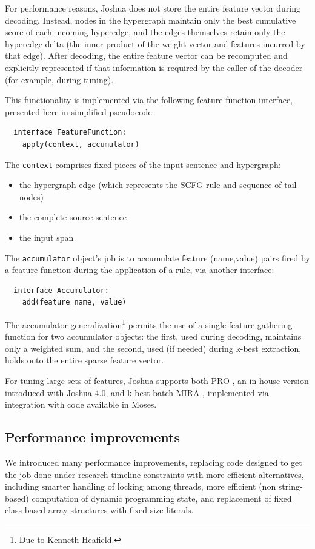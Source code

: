 \documentclass[11pt]{article}
\begin{document}
For performance reasons, Joshua does not store the entire feature
vector during decoding.  Instead, nodes in the hypergraph maintain
only the best cumulative score of each incoming hyperedge, and the
edges themselves retain only the hyperedge delta (the inner product of
the weight vector and features incurred by that edge).  After
decoding, the entire feature vector can be recomputed and explicitly
represented if that information is required by the caller of the
decoder (for example, during tuning).

This functionality is implemented via the following feature function
interface, presented here in simplified pseudocode:
%
\begin{verbatim}
  interface FeatureFunction:
    apply(context, accumulator)
\end{verbatim}
%
The \verb|context| comprises fixed pieces of the input sentence and
hypergraph:
%
\begin{itemize}
\item the hypergraph edge (which represents the SCFG rule and sequence
  of tail nodes)
\item the complete source sentence
\item the input span
\end{itemize}
%
The \verb|accumulator| object's job is to accumulate feature
(name,value) pairs fired by a feature function during the application of a
rule, via another interface:
%
\begin{verbatim}
  interface Accumulator:
    add(feature_name, value)
\end{verbatim}
%
The accumulator generalization\footnote{Due to Kenneth Heafield.}
permits the use of a single feature-gathering function for two
accumulator objects: the first, used during decoding, maintains only a
weighted sum, and the second, used (if needed) during k-best
extraction, holds onto the entire sparse feature vector.

For tuning large sets of features, Joshua supports both PRO
\cite{PRO2011}, an in-house version introduced with Joshua 4.0, and
k-best batch MIRA \cite{cherry2012batch}, implemented via integration
with code available in Moses.

\subsection{Performance improvements}
\label{sec:performance}

We introduced many performance improvements, replacing code designed
to get the job done under research timeline constraints with more
efficient alternatives, including smarter handling of locking among
threads, more efficient (non string-based) computation of dynamic
programming state, and replacement of fixed class-based array
structures with fixed-size literals.
\end{document}
